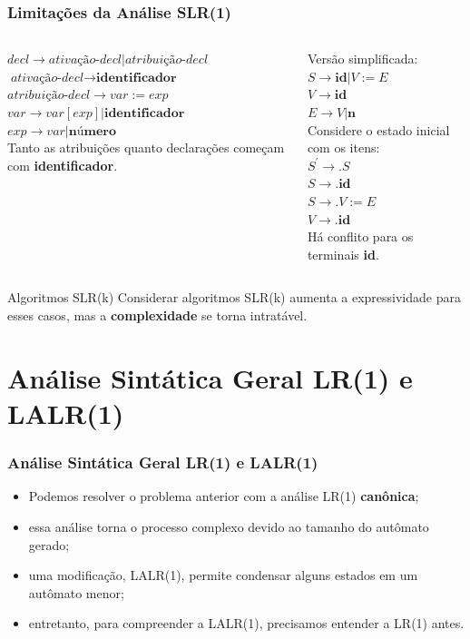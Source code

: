 \documentclass[table]{beamer}
\begin{document}
\begin{frame}
   \frametitle{Limitações da Análise SLR(1)}
   \begin{columns}
   \begin{column}{0.5\textwidth}
   \small
   $decl\to \textit{ativação-decl}|\textit{atribuição-decl}$ \\
   $\textit{ativação-decl}\to \textbf{identificador}$ \\
   $\textit{atribuição-decl}\to var:=exp$ \\
   $var \to var[exp] | \textbf{identificador}$ \\
   $exp \to var | \textbf{número}$ \\
   \vspace{1.0cm}
   Tanto as atribuições quanto declarações começam com \textbf{identificador}.
   \end{column}
   \begin{column}{0.5\textwidth}
   \small
   Versão simplificada: \\
   $S \to \textbf{id}|V:=E$ \\
   $V \to \textbf{id}$ \\
   $E \to V|\textbf{n}$ \\
   Considere o estado inicial com os itens: \\
   $S^{'} \to .S$ \\
   $S \to .\textbf{id}$ \\
   $S \to .V := E $ \\
   $V \to .\textbf{id}$ \\
   \vspace{1.0cm}
   Há conflito para os terminais \textbf{id}.
   \end{column}
   \end{columns}
   \begin{block}{Algoritmos SLR(k)}
   Considerar algoritmos SLR(k) aumenta a expressividade para esses casos, mas a \textbf{complexidade} se torna intratável.
   \end{block}
\end{frame}

\section{Análise Sintática Geral LR(1) e LALR(1)}
\begin{frame}
   \frametitle{Análise Sintática Geral LR(1) e LALR(1)}
   \begin{itemize}
      \item Podemos resolver o problema anterior com a análise LR(1) \textbf{canônica};
      \item essa análise torna o processo complexo devido ao tamanho do autômato gerado;
      \item uma modificação, LALR(1), permite condensar alguns estados em um autômato menor;
      \item entretanto, para compreender a LALR(1), precisamos entender a LR(1) antes.
   \end{itemize}
\end{frame}
\end{document}
